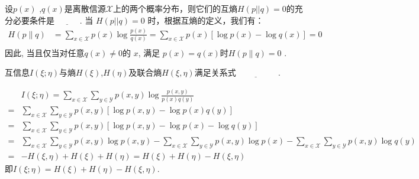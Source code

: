 \begin{tcolorbox}[breakable,colback=blue!5!white,colframe=blue!75!black,
 title= 填空题]
 设$p(x)$ ,$q(x)$是离散信源$\mathscr{X}$上的两个概率分布，则它们的互熵$H(p||q)=0$的充分必要条件是 $\underline{\hspace{1cm}}$ .
\tcblower
当 $ H(p||q) = 0 $ 时，根据互熵的定义，我们有：
$$
\begin{aligned}
H(p \| q) & =\sum_{x \in \mathscr{X}} p(x) \log \frac{p(x)}{q(x)}=\sum_{x \in \mathscr{X}} p(x) [\log p(x) - \log q(x)]=0\\
\end{aligned}
$$
因此, 当且仅当对任意$q(x)\neq 0$的 $ x $, 满足 $ p(x)=q(x)$时$ H(p \| q)=0 $ .



\end{tcolorbox}


\begin{tcolorbox}[breakable,colback=blue!5!white,colframe=blue!75!black,
 title= 填空题]
 互信息$I(\xi;\eta)$与熵$H(\xi)$,$H(\eta)$及联合熵$H(\xi,\eta)$满足关系式$\underline{\hspace{2cm}}$ .

\tcblower
$$
 \begin{aligned}
& I(\xi ; \eta)=\sum_{x \in \mathscr{X}} \sum_{y \in \mathscr{Y}} p(x, y) \log \frac{p(x, y)}{p(x) q(y)} \\
= & \sum_{x \in \mathscr{X}} \sum_{y \in \mathscr{Y}} p(x, y)[\log p(x, y)-\log p(x) q(y)] \\
= & \sum_{x \in \mathscr{X}} \sum_{y \in \mathscr{Y}} p(x, y)[\log p(x, y)-\log p(x)-\log q(y)] \\
= & \sum_{x \in \mathscr{X}} \sum_{y \in \mathscr{Y}} p(x, y) \log p(x, y)-\sum_{x \in \mathscr{X}} \sum_{y \in \mathscr{Y}} p(x, y) \log p(x)  -\sum_{x \in \mathscr{X}} \sum_{y \in \mathscr{Y}} p(x, y) \log q(y) \\
= & -H(\xi, \eta)+H(\xi)+H(\eta)=H(\xi)+H(\eta)-H(\xi, \eta)
\end{aligned}
$$
即$ I(\xi; \eta) =H(\xi)+H(\eta)-H(\xi,\eta) $.
\end{tcolorbox}


